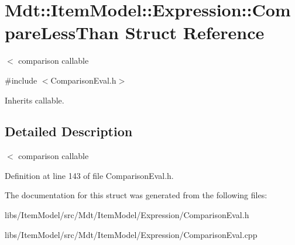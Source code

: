\hypertarget{struct_mdt_1_1_item_model_1_1_expression_1_1_compare_less_than}{}\section{Mdt\+:\+:Item\+Model\+:\+:Expression\+:\+:Compare\+Less\+Than Struct Reference}
\label{struct_mdt_1_1_item_model_1_1_expression_1_1_compare_less_than}


$<$ comparison callable  




{\ttfamily \#include $<$Comparison\+Eval.\+h$>$}



Inherits callable.



\subsection{Detailed Description}
$<$ comparison callable 

Definition at line 143 of file Comparison\+Eval.\+h.



The documentation for this struct was generated from the following files\+:\begin{DoxyCompactItemize}
\item 
libs/\+Item\+Model/src/\+Mdt/\+Item\+Model/\+Expression/Comparison\+Eval.\+h\item 
libs/\+Item\+Model/src/\+Mdt/\+Item\+Model/\+Expression/Comparison\+Eval.\+cpp\end{DoxyCompactItemize}
